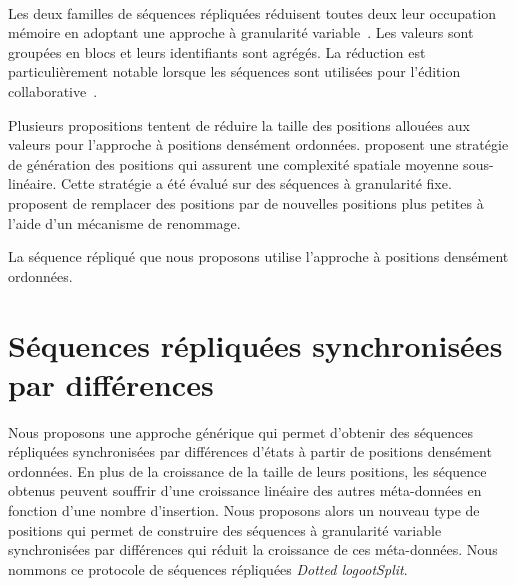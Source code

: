 
\paragraph{}Les deux familles de séquences répliquées réduisent toutes deux leur occupation mémoire en adoptant une approche à granularité variable~\cite{yu_2012_string-wise-crdt, andre_2013_logootsplit, briot_2016_rgasplit}.
Les valeurs sont groupées en blocs et leurs identifiants sont agrégés.
La réduction est particulièrement notable lorsque les séquences sont utilisées pour l'édition collaborative~\autocite{andre_2013_logootsplit,briot_2016_rgasplit}.

Plusieurs propositions tentent de réduire la taille des positions allouées aux valeurs pour l'approche à positions densément ordonnées.
\textcite{nedelec_2013_lseq} proposent une stratégie de génération des positions qui assurent une complexité spatiale moyenne sous-linéaire.
Cette stratégie a été évalué sur des séquences à granularité fixe.
\textcite{nicolas2020_renaming} proposent de remplacer des positions par de nouvelles positions plus petites à l'aide d'un mécanisme de renommage.


La séquence répliqué que nous proposons utilise l'approche à positions densément ordonnées.



\section{Séquences répliquées synchronisées par différences}\label{sec:delta-seq}


Nous proposons une approche générique qui permet d'obtenir des séquences répliquées synchronisées par différences d'états à partir de positions densément ordonnées.
En plus de la croissance de la taille de leurs positions, les séquence obtenus peuvent souffrir d'une croissance linéaire des autres méta-données en fonction d'une nombre d'insertion.
Nous proposons alors un nouveau type de positions qui permet de construire des séquences à granularité variable synchronisées par différences qui réduit la croissance de ces méta-données.
Nous nommons ce protocole de séquences répliquées \emph{Dotted logootSplit}.

